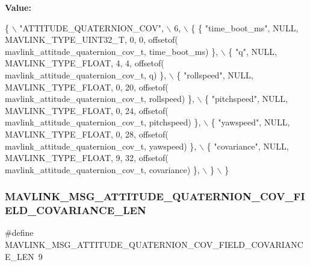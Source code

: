 {\bfseries Value\+:}
\begin{DoxyCode}
\{ \(\backslash\)
    \textcolor{stringliteral}{"ATTITUDE\_QUATERNION\_COV"}, \(\backslash\)
    6, \(\backslash\)
    \{  \{ \textcolor{stringliteral}{"time\_boot\_ms"}, NULL, MAVLINK_TYPE_UINT32_T, 0, 0, offsetof(
      mavlink_attitude_quaternion_cov_t, time\_boot\_ms) \}, \(\backslash\)
         \{ \textcolor{stringliteral}{"q"}, NULL, MAVLINK_TYPE_FLOAT, 4, 4, offsetof(
      mavlink_attitude_quaternion_cov_t, q) \}, \(\backslash\)
         \{ \textcolor{stringliteral}{"rollspeed"}, NULL, MAVLINK_TYPE_FLOAT, 0, 20, offsetof(
      mavlink_attitude_quaternion_cov_t, rollspeed) \}, \(\backslash\)
         \{ \textcolor{stringliteral}{"pitchspeed"}, NULL, MAVLINK_TYPE_FLOAT, 0, 24, offsetof(
      mavlink_attitude_quaternion_cov_t, pitchspeed) \}, \(\backslash\)
         \{ \textcolor{stringliteral}{"yawspeed"}, NULL, MAVLINK_TYPE_FLOAT, 0, 28, offsetof(
      mavlink_attitude_quaternion_cov_t, yawspeed) \}, \(\backslash\)
         \{ \textcolor{stringliteral}{"covariance"}, NULL, MAVLINK_TYPE_FLOAT, 9, 32, offsetof(
      mavlink_attitude_quaternion_cov_t, covariance) \}, \(\backslash\)
         \} \(\backslash\)
\}
\end{DoxyCode}
\mbox{\label{mavlink__msg__attitude__quaternion__cov_8h_adaeda392bc19daee5d17422aa03c7aee}} 
\subsubsection{M\+A\+V\+L\+I\+N\+K\+\_\+\+M\+S\+G\+\_\+\+A\+T\+T\+I\+T\+U\+D\+E\+\_\+\+Q\+U\+A\+T\+E\+R\+N\+I\+O\+N\+\_\+\+C\+O\+V\+\_\+\+F\+I\+E\+L\+D\+\_\+\+C\+O\+V\+A\+R\+I\+A\+N\+C\+E\+\_\+\+L\+EN}
{\footnotesize\ttfamily \#define M\+A\+V\+L\+I\+N\+K\+\_\+\+M\+S\+G\+\_\+\+A\+T\+T\+I\+T\+U\+D\+E\+\_\+\+Q\+U\+A\+T\+E\+R\+N\+I\+O\+N\+\_\+\+C\+O\+V\+\_\+\+F\+I\+E\+L\+D\+\_\+\+C\+O\+V\+A\+R\+I\+A\+N\+C\+E\+\_\+\+L\+EN~9}

